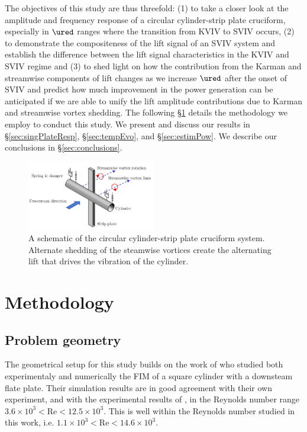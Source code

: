 \documentclass[a4paper,fleqn]{cas-sc}
\begin{document}
The objectives of this study are thus threefold: (1) to take a closer look at the amplitude and frequency response of a circular cylinder-strip plate cruciform, especially in $\ured$ ranges where the transition from KVIV to SVIV occurs, (2) to demonstrate the compositeness of the lift signal of an SVIV system and establish the difference between the lift signal characteristics in the KVIV and SVIV regime and (3) to shed light on how the contribution from the Karman and streamwise components of lift changes as we increase $\ured$ after the onset of SVIV and predict how much improvement in the power generation can be anticipated if we are able to unify the lift amplitude contributions due to Karman and streamwise vortex shedding. The following \S\ref{sec:method} details the methodology we employ to conduct this study. We present and discuss our results in \S\ref{sec:singPlateResp}, \S\ref{sec:tempEvo}, and \S\ref{sec:estimPow}. We describe our conclusions in \S\ref{sec:conclusions}.

\begin{figure}
  \centering
  \includegraphics[width=0.5\textwidth]{figs/figure1}
  \caption{A schematic of the circular cylinder-strip plate cruciform system. Alternate shedding of the steamwise vortices create the alternating lift that drives the vibration of the cylinder.}
  \label{fig:cruciformSystemSchematic}
\end{figure}

\section{Methodology} \label{sec:method}
\subsection{Problem geometry} \label{ssec:probGeo}
The geometrical setup for this study builds on the work of \citet{Maruai2017,Maruai2018} who studied both experimentaly and numerically the FIM of a square cylinder with a downsteam flate plate. Their simulation results are in good agreement with their own experiment, and with the experimental results of \citet{Kawabata2013}, in the Reynolds number range $3.6\times10^{3}<\text{Re}<12.5\times10^{3}$. This is well within the Reynolds number studied in this work, i.e. $1.1\times10^{3}<\text{Re}<14.6\times10^{3}$.
\end{document}
